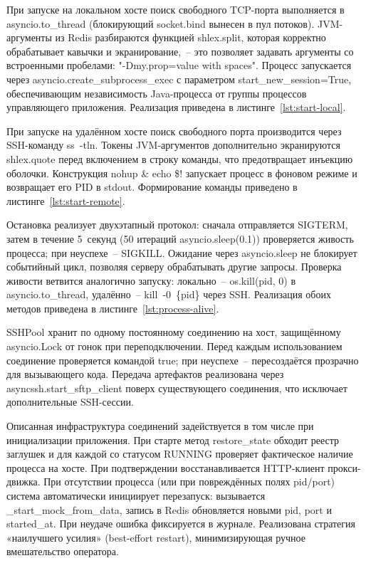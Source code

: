 При запуске на локальном хосте поиск свободного TCP-порта выполняется в asyncio.to\_thread (блокирующий socket.bind вынесен в пул потоков). JVM-аргументы из Redis разбираются функцией shlex.split, которая корректно обрабатывает кавычки и экранирование,~-- это позволяет задавать аргументы со встроенными пробелами: "{}-Dmy.prop=value with spaces". Процесс запускается через asyncio.create\_subprocess\_exec с параметром start\_new\_session=True, обеспечивающим независимость Java-процесса от группы процессов управляющего приложения. Реализация приведена в листинге~\ref{lst:start-local}.


При запуске на удалённом хосте поиск свободного порта производится через SSH-команду ss~-tln. Токены JVM-аргументов дополнительно экранируются shlex.quote перед включением в строку команды, что предотвращает инъекцию оболочки. Конструкция nohup \& echo \$! запускает процесс в фоновом режиме и возвращает его PID в stdout. Формирование команды приведено в листинге~\ref{lst:start-remote}.



Остановка реализует двухэтапный протокол: сначала отправляется SIGTERM, затем в течение 5~секунд (50 итераций asyncio.sleep(0.1)) проверяется живость процесса; при неуспехе~-- SIGKILL. Ожидание через asyncio.sleep не блокирует событийный цикл, позволяя серверу обрабатывать другие запросы. Проверка живости ветвится аналогично запуску: локально~-- os.kill(pid, 0) в asyncio.to\_thread, удалённо~-- kill~-0~\{pid\} через SSH. Реализация обоих методов приведена в листинге~\ref{lst:process-alive}.


SSHPool хранит по одному постоянному соединению на хост, защищённому asyncio.Lock от гонок при переподключении. Перед каждым использованием соединение проверяется командой true; при неуспехе~-- пересоздаётся прозрачно для вызывающего кода. Передача артефактов реализована через asyncssh.start\_sftp\_client поверх существующего соединения, что исключает дополнительные SSH-сессии.


Описанная инфраструктура соединений задействуется в том числе при инициализации приложения. При старте метод restore\_state обходит реестр заглушек и для каждой со статусом RUNNING проверяет фактическое наличие процесса на хосте. При подтверждении восстанавливается HTTP-клиент прокси-движка. При отсутствии процесса (или при повреждённых полях pid/port) система автоматически инициирует перезапуск: вызывается \_start\_mock\_from\_data, запись в Redis обновляется новыми pid, port и started\_at. При неудаче ошибка фиксируется в журнале. Реализована стратегия «наилучшего усилия» (best-effort restart), минимизирующая ручное вмешательство оператора.

